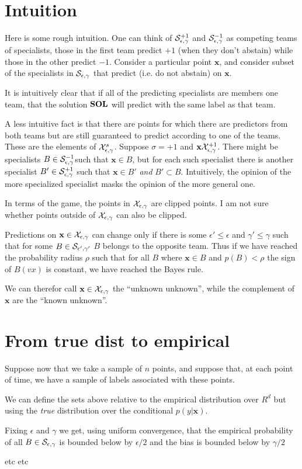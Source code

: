 \documentclass{article}
\renewcommand{\SS}{{\cal S}}
\newcommand{\vx}{\mathbf{x}}
\begin{document}
\section{Intuition}
Here is some rough intuition.
One can think of $\SepsGam^{+1}$ and $\SepsGam^{-1}$ as competing teams
of specialists, those in the first team predict $+1$ (when they don't abstain)
while those in the other predict $-1$. Consider a particular point
$\vx$, and consider subset of the specialists in $\SepsGam$ that
predict (i.e. do not abstain) on $\vx$.

It is intuitively clear that if all of the predicting specialists
are members one team, that the solution ${\bf SOL}$ will predict with the
same label as that team.

A less intuitive fact is that there are points for which there are
predictors from both teams but are still guaranteed to predict
according to one of the teams. These are the elements of
${\cal X}_{\epsilon,\gamma}^{s}$. Suppose $\sigma=+1$ and $\vx \XepsGam^{+1}$. There
might be specialists $B \in \SepsGam^{-1}$such that $\vx \in B$, but
for each such specialist there is another specialist $B' \in
\SepsGam^{+1}$ such that $\vx \in B'$ {\em and} $B' \subset
B$. Intuitively, the opinion of the more specialized specialist masks
the opinion of the more general one.

In terms of the game, the points in ${\cal X}_{\epsilon,\gamma}$ are clipped points. I
am not sure whether points outside of ${\cal X}_{\epsilon,\gamma}$ can also be clipped.

Predictions on $\vx \in \XepsGam$ can change only if there is some
$\epsilon' \leq \epsilon$ and $\gamma'\leq \gamma$ such that for some 
$B \in \SS_{\epsilon',\gamma'}$ $B$ belongs to the opposite
team. Thus if we have reached the probability radius $\rho$ such that
for all $B$ where $\vx \in B$ and $p(B)<\rho$ the sign of $B(vx)$ is
constant, we have reached the Bayes rule.

We can therefor call $\vx \in \XepsGam$ the ``unknown unknown'', while
the complement of $\vx$ are the ``known unknown''.

\section{From true dist to empirical}

Suppose now that we take a sample of $n$ points, and suppose that, at
each point of time, we have a sample of labels associated with
these points.

We can define the sets above relative to the empirical distribution
over $R^d$ but using the {\em true} distribution over the conditional
$p(y|\vx)$.

Fixing $\epsilon$ and $\gamma$ we get, using uniform convergence, that
the empirical probability of all $B \in \SepsGam$ is bounded below by
$\epsilon/2$ and the bias is bounded below by $\gamma/2$

etc etc
\end{document}
